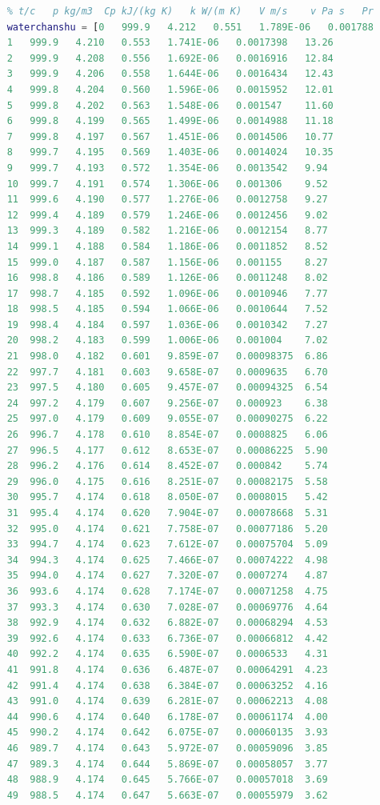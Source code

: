 \documentclass{article}
\begin{document}
 	\begin{lstlisting}[language=matlab]
 	%温度t/c	密度      比热容	     热导率	 运动黏度   动力黏度	普朗特数
 	% t/c   p kg/m3  Cp kJ/(kg K)   k W/(m K)   V m/s    v Pa s   Pr
 	waterchanshu = [0	999.9	4.212	0.551	1.789E-06	0.001788	13.67
 	1	999.9	4.210	0.553	1.741E-06	0.0017398	13.26
 	2	999.9	4.208	0.556	1.692E-06	0.0016916	12.84
 	3	999.9	4.206	0.558	1.644E-06	0.0016434	12.43
 	4	999.8	4.204	0.560	1.596E-06	0.0015952	12.01
 	5	999.8	4.202	0.563	1.548E-06	0.001547	11.60
 	6	999.8	4.199	0.565	1.499E-06	0.0014988	11.18
 	7	999.8	4.197	0.567	1.451E-06	0.0014506	10.77
 	8	999.7	4.195	0.569	1.403E-06	0.0014024	10.35
 	9	999.7	4.193	0.572	1.354E-06	0.0013542	9.94
 	10	999.7	4.191	0.574	1.306E-06	0.001306	9.52
 	11	999.6	4.190	0.577	1.276E-06	0.0012758	9.27
 	12	999.4	4.189	0.579	1.246E-06	0.0012456	9.02
 	13	999.3	4.189	0.582	1.216E-06	0.0012154	8.77
 	14	999.1	4.188	0.584	1.186E-06	0.0011852	8.52
 	15	999.0	4.187	0.587	1.156E-06	0.001155	8.27
 	16	998.8	4.186	0.589	1.126E-06	0.0011248	8.02
 	17	998.7	4.185	0.592	1.096E-06	0.0010946	7.77
 	18	998.5	4.185	0.594	1.066E-06	0.0010644	7.52
 	19	998.4	4.184	0.597	1.036E-06	0.0010342	7.27
 	20	998.2	4.183	0.599	1.006E-06	0.001004	7.02
 	21	998.0	4.182	0.601	9.859E-07	0.00098375	6.86
 	22	997.7	4.181	0.603	9.658E-07	0.0009635	6.70
 	23	997.5	4.180	0.605	9.457E-07	0.00094325	6.54
 	24	997.2	4.179	0.607	9.256E-07	0.000923	6.38
 	25	997.0	4.179	0.609	9.055E-07	0.00090275	6.22
 	26	996.7	4.178	0.610	8.854E-07	0.0008825	6.06
 	27	996.5	4.177	0.612	8.653E-07	0.00086225	5.90
 	28	996.2	4.176	0.614	8.452E-07	0.000842	5.74
 	29	996.0	4.175	0.616	8.251E-07	0.00082175	5.58
 	30	995.7	4.174	0.618	8.050E-07	0.0008015	5.42
 	31	995.4	4.174	0.620	7.904E-07	0.00078668	5.31
 	32	995.0	4.174	0.621	7.758E-07	0.00077186	5.20
 	33	994.7	4.174	0.623	7.612E-07	0.00075704	5.09
 	34	994.3	4.174	0.625	7.466E-07	0.00074222	4.98
 	35	994.0	4.174	0.627	7.320E-07	0.0007274	4.87
 	36	993.6	4.174	0.628	7.174E-07	0.00071258	4.75
 	37	993.3	4.174	0.630	7.028E-07	0.00069776	4.64
 	38	992.9	4.174	0.632	6.882E-07	0.00068294	4.53
 	39	992.6	4.174	0.633	6.736E-07	0.00066812	4.42
 	40	992.2	4.174	0.635	6.590E-07	0.0006533	4.31
 	41	991.8	4.174	0.636	6.487E-07	0.00064291	4.23
 	42	991.4	4.174	0.638	6.384E-07	0.00063252	4.16
 	43	991.0	4.174	0.639	6.281E-07	0.00062213	4.08
 	44	990.6	4.174	0.640	6.178E-07	0.00061174	4.00
 	45	990.2	4.174	0.642	6.075E-07	0.00060135	3.93
 	46	989.7	4.174	0.643	5.972E-07	0.00059096	3.85
 	47	989.3	4.174	0.644	5.869E-07	0.00058057	3.77
 	48	988.9	4.174	0.645	5.766E-07	0.00057018	3.69
 	49	988.5	4.174	0.647	5.663E-07	0.00055979	3.62

\end{lstlisting}
\end{document}

